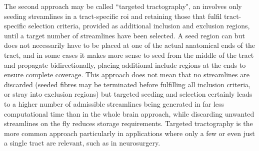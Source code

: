 The second approach may be called ``targeted tractography", an involves only seeding streamlines in a tract-specific \gls{roi} and retaining those that fulfil tract-specific selection criteria, provided as additional inclusion and exclusion regions, until a target number of streamlines have been selected.
A seed region can but does not necessarily have to be placed at one of the actual anatomical ends of the tract, and in some cases it makes more sense to seed from the middle of the tract and propagate bidirectionally, placing additional include regions at the ends to ensure complete coverage.
This approach does not mean that no streamlines are discarded (seeded fibres may be terminated before fulfilling all inclusion criteria, or stray into exclusion regions) but targeted seeding and selection certainly leads to a higher number of admissible streamlines being generated in far less computational time than in the whole brain approach, while discarding unwanted streamlines on the fly reduces storage requirements.
Targeted tractography is the more common approach particularly in applications where only a few or even just a single tract are relevant, such as in neurosurgery\autocite{Yang2021}.

